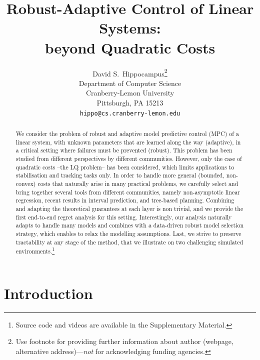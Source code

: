 \documentclass{article}
\title{Robust-Adaptive Control of Linear Systems:\\ beyond Quadratic Costs}
\author{%
	David S.~Hippocampus\thanks{Use footnote for providing further information
		about author (webpage, alternative address)---\emph{not} for acknowledging
		funding agencies.} \\
	Department of Computer Science\\
	Cranberry-Lemon University\\
	Pittsburgh, PA 15213 \\
	\texttt{hippo@cs.cranberry-lemon.edu} \\
}
\begin{document}
	
\maketitle

\begin{abstract}
We consider the problem of robust and adaptive model predictive control (MPC) of a linear system, with unknown parameters that are learned along the way (adaptive), in a critical setting where failures must be prevented (robust). This problem has been studied from different perspectives by different communities. However, only the case of quadratic costs --the LQ problem-- has been considered, which limits applications to stabilisation and tracking tasks only. In order to handle more general (bounded, non-convex) costs that naturally arise in many practical problems, we carefully select and bring together several tools from different communities, namely non-asymptotic linear regression, recent results in interval prediction, and tree-based planning. Combining and adapting the theoretical guarantees at each layer is non trivial, and we provide the first end-to-end regret analysis for this setting. Interestingly, our analysis naturally adapts to handle many models and combines with a data-driven robust model selection strategy, which enables to relax the modelling assumptions. Last, we strive to preserve tractability at any stage of the method, that we illustrate on two challenging simulated environments.\footnote{Source code and videos are available in the Supplementary Material.}
\end{abstract}	




\section{Introduction}
\end{document}
